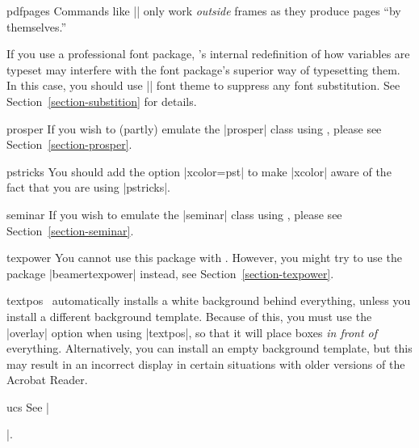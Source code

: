 \begin{package}{{pdfpages}}
  Commands like || only work \emph{outside} frames as they produce pages ``by themselves.''
\end{package}  
 
\begin{package}{{\normalfont{}}}
  \beamernote
  If you use a professional font package, \beamer's internal redefinition of how variables are typeset may interfere with the font package's superior way of typesetting them. In this case, you should use || font theme to suppress any font substitution. See Section~\ref{section-substition} for details.
\end{package}

\begin{class}{{prosper}}
  If you wish to (partly) emulate the |prosper| class using \beamer, please see Section~\ref{section-prosper}.
\end{class}

\begin{package}{{pstricks}}
  You should add the option |xcolor=pst| to make |xcolor| aware of the fact that you are using |pstricks|.
\end{package}

\begin{class}{{seminar}}
  If you wish to emulate the |seminar| class using \beamer, please see Section~\ref{section-seminar}.
\end{class}

\begin{package}{{texpower}}
  You cannot use this package with \beamer. However, you might try to use the package |beamertexpower| instead, see Section~\ref{section-texpower}.
\end{package}

\begin{package}{{textpos}}
  \beamernote
  \beamer\ automatically installs a white background behind everything, unless you install a different background template. Because of this, you must use the |overlay| option when using |textpos|, so that it will place boxes \emph{in front of} everything. Alternatively, you can install an empty background template, but this may result in an incorrect display in certain situations with older versions of the Acrobat Reader.
\end{package}

\begin{package}{{ucs}}
  See |\usepackage[utf8,utf8x]{inputenc}|.
\end{package}

